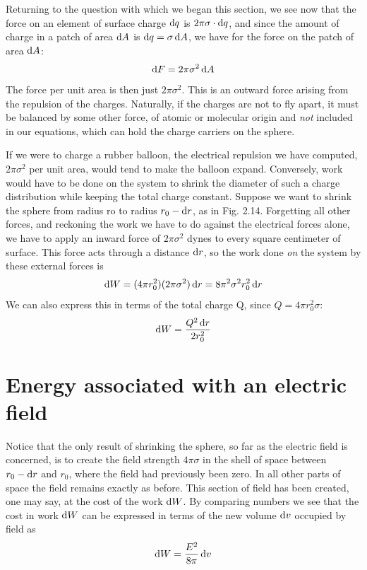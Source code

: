 Returning to the question with which we began this section, we see
now that the force on an element of surface charge $\operatorname{d\!} q$ is $2\pi\sigma\cdot\operatorname{d\!} q$, and
since the amount of charge in a patch of area $\operatorname{d\!} A$ is $\operatorname{d\!} q = \sigma \operatorname{d\!} A$, we
have for the force on the patch of area $\operatorname{d\!} A$:
\begin{equation}
  \operatorname{d\!} F = 2\pi\sigma^2\operatorname{d\!} A
\end{equation}
The force per unit area is then just $2\pi\sigma^2$. This is an outward force
arising from the repulsion of the charges. Naturally, if the charges
are not to fly apart, it must be balanced by some other force, of atomic
or molecular origin and \emph{not} included in our equations, which can hold
the charge carriers on the sphere.

If we were to charge a rubber balloon, the electrical repulsion we
have computed, $2\pi\sigma^2$ per unit area, would tend to make the balloon
expand. Conversely, work would have to be done on the system to
shrink the diameter of such a charge distribution while keeping the
total charge constant. Suppose we want to shrink the sphere from
radius ro to radius $r_0 - \operatorname{d\!} r$, as in Fig. 2.14. Forgetting all other
forces, and reckoning the work we have to do against the electrical
forces alone, we have to apply an inward force of $2\pi\sigma^2$ dynes to every
square centimeter of surface. This force acts through a distance $\operatorname{d\!} r$,
so the work done \emph{on} the system by these external forces is
\begin{equation}
  \operatorname{d\!} W = (4\pi r_0^2)(2\pi\sigma^2)\operatorname{d\!} r = 8\pi^2\sigma^2r_0^2\operatorname{d\!} r
\end{equation}
We can also express this in terms of the total charge Q, since
$Q=4\pi r_0^2\sigma$:
\begin{equation}
  \operatorname{d\!} W = \frac{Q^2\operatorname{d\!} r}{2 r_0^2}
\end{equation}


\section{Energy associated with an electric field}

Notice that the only result of shrinking the sphere, so far as the
electric field is concerned, is to create the field strength $4\pi\sigma$ in the
shell of space between $r_0-\operatorname{d\!} r$ and $r_0$, where the field had previously
been zero. In all other parts of space the field remains exactly as
before. This section of field has been created, one may say, at the
cost of the work $\operatorname{d\!} W$. By comparing numbers we see that the cost
in work $\operatorname{d\!} W$ can be expressed in terms of the new volume $\operatorname{d\!} v$ occupied
by field as
\begin{equation}
  \operatorname{d\!} W = \frac{E^2}{8\pi}\operatorname{d\!} v
\end{equation}

